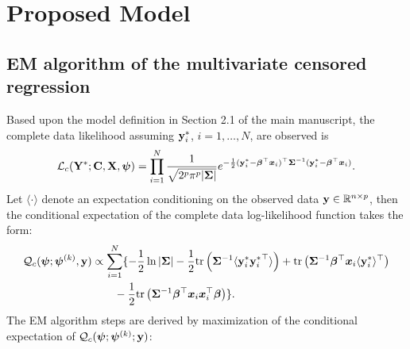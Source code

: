 \documentclass{interact}
\theoremstyle{plain}
\theoremstyle{definition}
\theoremstyle{remark}
\begin{document}
\renewcommand{\thefigure}{S.\arabic{figure}}
\renewcommand{\thetable}{S.\arabic{table}}

\appendix



\section{Proposed Model}


\subsection{EM algorithm of the multivariate censored regression}
\label{Supplement:1.1}
Based upon the model definition in Section 2.1 of the main manuscript, the complete data likelihood assuming $\mathbf{y}_i^*$, $i=1,\dots,N$, are observed is
\begin{align*}
    \mathcal{L}_c(\mathbf{Y}^*;\textbf{C},\mathbf{X},\bm{\psi})=\prod_{i=1}^N\frac{1}{\sqrt{2^p\pi^p|\bm{\Sigma}|}}e^{-\frac{1}{2}(\mathbf{y}_i^*-{\bm \beta}^\top\bm{x}_i)^\top\bm{\Sigma}^{-1}(\mathbf{y}_i^*-{\bm \beta}^\top\bm{x}_i)}.
\end{align*}
Let $\langle \cdot \rangle$ denote an expectation conditioning on the observed data $\mathbf{y}\in \mathbb{R}^{n\times p}$, then the conditional expectation of the complete data log-likelihood function takes the form:
\begin{align*}
    \begin{split}
        \mathcal{Q}_c(\bm{\psi};\bm{\psi}^{(k)},\mathbf{y})
        &\propto\sum_{i=1}^N\{-\frac{1}{2}\ln{|\bm{\Sigma}|}-\frac{1}{2}\mathrm{tr}\left(\bm{\Sigma}^{-1}\langle\mathbf{y}_i^*{\mathbf{y}_i^*}^\top\rangle\right)+\mathrm{tr}\left(\bm{\Sigma}^{-1}{\bm \beta}^\top\bm{x}_i\langle {\mathbf{y}_i^*}\rangle^\top\right)\\
        &\qquad-\frac{1}{2}\mathrm{tr}\left(\bm{\Sigma}^{-1}{\bm \beta}^\top\bm{x}_i\bm{x}_i^\top{\bm \beta}\right)\}.
    \end{split}
\end{align*}
The EM algorithm steps are derived by maximization of the conditional expectation of $\mathcal{Q}_c(\bm{\psi};\bm{\psi}^{(k)};\mathbf{y})$:
\end{document}
